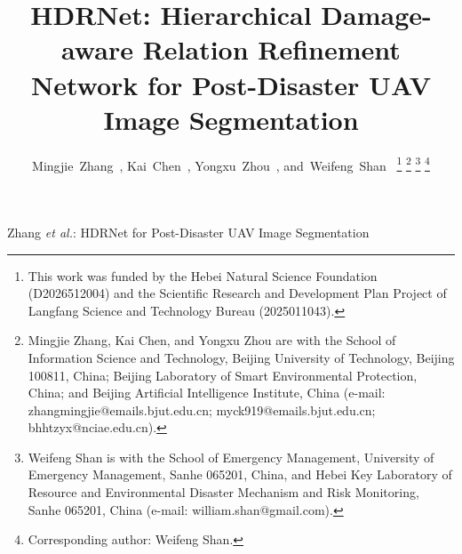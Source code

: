 \documentclass[lettersize,journal]{IEEEtran}
\begin{document}
\title{HDRNet: Hierarchical Damage-aware Relation Refinement Network for Post-Disaster UAV Image Segmentation}

\author{Mingjie~Zhang~,
        Kai~Chen~,
        Yongxu~Zhou~,
        and~Weifeng~Shan~
\thanks{This work was funded by the Hebei Natural Science Foundation (D2026512004) and the Scientific Research and Development Plan Project of Langfang Science and Technology Bureau (2025011043).}
\thanks{Mingjie Zhang, Kai Chen, and Yongxu Zhou are with the School of Information Science and Technology, Beijing University of Technology, Beijing 100811, China; Beijing Laboratory of Smart Environmental Protection, China; and Beijing Artificial Intelligence Institute, China (e-mail: zhangmingjie@emails.bjut.edu.cn; myck919@emails.bjut.edu.cn; bhhtzyx@nciae.edu.cn).}
\thanks{Weifeng Shan is with the School of Emergency Management, University of Emergency Management, Sanhe 065201, China, and Hebei Key Laboratory of Resource and Environmental Disaster Mechanism and Risk Monitoring, Sanhe 065201, China (e-mail: william.shan@gmail.com).}
\thanks{Corresponding author: Weifeng Shan.}}

%
{Zhang \MakeLowercase{\textit{et al.}}: HDRNet for Post-Disaster UAV Image Segmentation}

\maketitle
\end{document}
